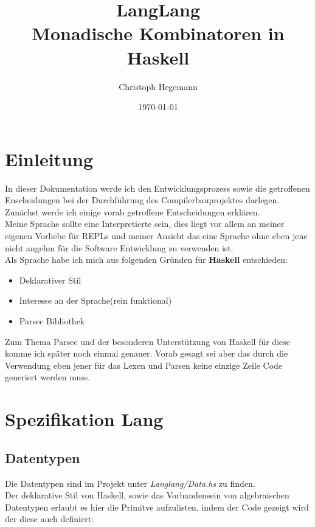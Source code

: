 \documentclass[12pt,german]{article}
\author{Christoph Hegemann}
\title{LangLang\\Monadische Kombinatoren in Haskell}
\date{\today}
\begin{document}
\maketitle
\newpage
\tableofcontents

\section{Einleitung}
In dieser Dokumentation werde ich den Entwicklungsprozess
sowie die getroffenen Enscheidungen bei der Durchführung des
Compilerbauprojektes darlegen. Zunächst werde ich einige vorab
getroffene Entscheidungen erklären.
\\

Meine Sprache sollte eine Interpretierte sein, dies liegt vor allem an
meiner eigenen Vorliebe für REPLs und meiner Ansicht das eine Sprache ohne
eben jene nicht angehm für die Software Entwicklung zu verwenden ist.
\\

\noindent
Als Sprache habe ich mich aus folgenden Gründen für \textbf{Haskell}
entschieden:
\begin{itemize}
\item Deklarativer Stil
\item Interesse an der Sprache(rein funktional)
\item Parsec Bibliothek
\end{itemize}

Zum Thema Parsec und der besonderen Unterstützung von Haskell für
diese komme ich später noch einmal genauer. Vorab gesagt sei aber das
durch die Verwendung eben jener für das Lexen und Parsen keine einzige
Zeile Code generiert werden muss.

\section{Spezifikation Lang}
\subsection{Datentypen}

Die Datentypen sind im Projekt unter \textit{Langlang/Data.hs} zu finden.\\
Der deklarative Stil von Haskell, sowie das Vorhandensein von
algebraischen Datentypen erlaubt es hier die Primitve
aufzulisten, indem der Code gezeigt wird der diese auch definiert:
\end{document}

